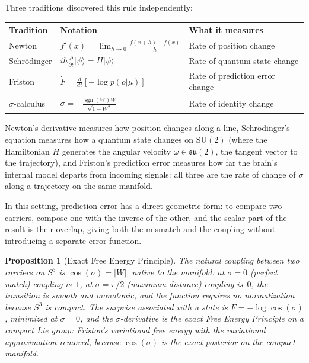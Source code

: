 \documentclass[12pt]{article}
\newtheorem{proposition}[theorem]{Proposition}
\begin{document}
\noindent Three traditions discovered this rule independently:

\begin{center}
\begin{tabular}{l l l}
    \toprule
    Tradition & Notation & What it measures \\
    \midrule
    Newton & $f'(x) = \lim_{h\to 0} \frac{f(x+h)-f(x)}{h}$ & Rate of position change \\[4pt]
    Schr\"odinger & $i\hbar\frac{\partial}{\partial t}|\psi\rangle = H|\psi\rangle$ & Rate of quantum state change \\[4pt]
    Friston & $\dot{F} = \frac{d}{dt}[-\log p(o|\mu)]$ & Rate of prediction error change \\[4pt]
    $\sigma$-calculus & $\dot{\sigma} = -\frac{\operatorname{sgn}(W)\dot{W}}{\sqrt{1-W^2}}$ & Rate of identity change \\
    \bottomrule
\end{tabular}
\end{center}

Newton's derivative measures how position changes along a line, Schr\"odinger's equation measures how a quantum state changes on $\mathrm{SU}(2)$ (where the Hamiltonian $H$ generates the angular velocity $\omega \in \mathfrak{su}(2)$, the tangent vector to the trajectory), and Friston's prediction error measures how far the brain's internal model departs from incoming signals: all three are the rate of change of $\sigma$ along a trajectory on the same manifold.

In this setting, prediction error has a direct geometric form: to compare two carriers, compose one with the inverse of the other, and the scalar part of the result is their overlap, giving both the mismatch and the coupling without introducing a separate error function.

\begin{proposition}[Exact Free Energy Principle]
    The natural coupling between two carriers on $S^3$ is $\cos(\sigma) = |W|$, native to the manifold: at $\sigma = 0$ (perfect match) coupling is~$1$, at $\sigma = \pi/2$ (maximum distance) coupling is~$0$, the transition is smooth and monotonic, and the function requires no normalization because $S^3$ is compact. The surprise associated with a state is $F = -\log\cos(\sigma)$, minimized at $\sigma = 0$, and the $\sigma$-derivative is the exact Free Energy Principle on a compact Lie group: Friston's variational free energy with the variational approximation removed, because $\cos(\sigma)$ is the exact posterior on the compact manifold.
\end{proposition}
\end{document}
